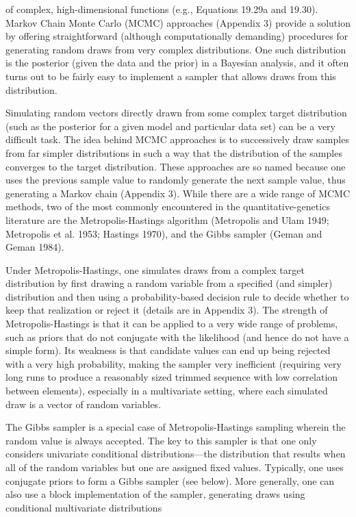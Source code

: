 \documentclass{article}
\begin{document}
of complex, high-dimensional functions (e.g., Equations 19.29a and 19.30). Markov Chain Monte Carlo (MCMC) approaches (Appendix 3) provide a solution by offering straightforward (although computationally demanding) procedures for generating random draws from very complex distributions. One such distribution is the posterior (given the data and the prior) in a Bayesian analysis, and it often turns out to be fairly easy to implement a sampler that allows draws from this distribution.

Simulating random vectors directly drawn from some complex target distribution (such as the posterior for a given model and particular data set) can be a very difficult task. The idea behind MCMC approaches is to successively draw samples from far simpler distributions in such a way that the distribution of the samples converges to the target distribution. These approaches are so named because one uses the previous sample value to randomly generate the next sample value, thus generating a Markov chain (Appendix 3). While there are a wide range of MCMC methods, two of the most commonly encountered in the quantitative-genetics literature are the Metropolis-Hastings algorithm (Metropolis and Ulam 1949; Metropolis et al. 1953; Hastings 1970), and the Gibbs sampler (Geman and Geman 1984).

Under Metropolis-Hastings, one simulates draws from a complex target distribution by first drawing a random variable from a specified (and simpler) distribution and then using a probability-based decision rule to decide whether to keep that realization or reject it (details are in Appendix 3). The strength of Metropolis-Hastings is that it can be applied to a very wide range of problems, such as priors that do not conjugate with the likelihood (and hence do not have a simple form). Its weakness is that candidate values can end up being rejected with a very high probability, making the sampler very inefficient (requiring very long runs to produce a reasonably sized trimmed sequence with low correlation between elements), especially in a multivariate setting, where each simulated draw is a vector of random variables.

The Gibbs sampler is a special case of Metropolis-Hastings sampling wherein the random value is always accepted. The key to this sampler is that one only considers univariate conditional distributions—the distribution that results when all of the random variables but one are assigned fixed values. Typically, one uses conjugate priors to form a Gibbs sampler (see below). More generally, one can also use a block implementation of the sampler, generating draws using conditional multivariate distributions
\end{document}
